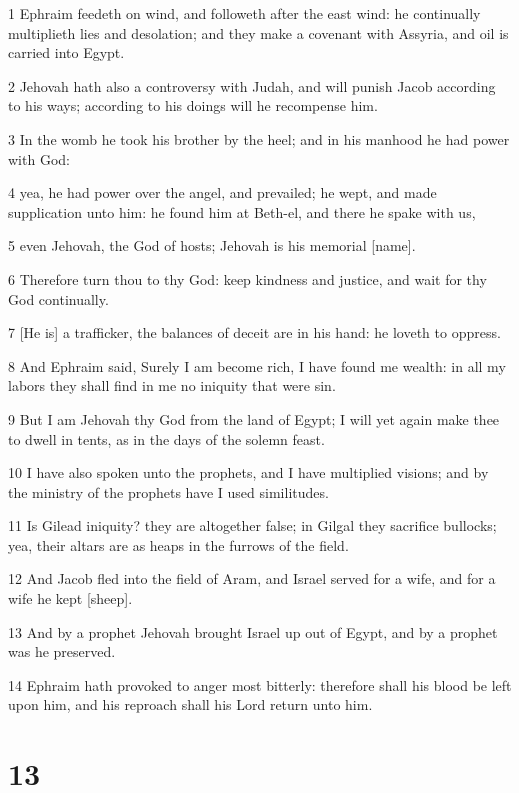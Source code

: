 \par 1 Ephraim feedeth on wind, and followeth after the east wind: he continually multiplieth lies and desolation; and they make a covenant with Assyria, and oil is carried into Egypt.
\par 2 Jehovah hath also a controversy with Judah, and will punish Jacob according to his ways; according to his doings will he recompense him.
\par 3 In the womb he took his brother by the heel; and in his manhood he had power with God:
\par 4 yea, he had power over the angel, and prevailed; he wept, and made supplication unto him: he found him at Beth-el, and there he spake with us,
\par 5 even Jehovah, the God of hosts; Jehovah is his memorial [name].
\par 6 Therefore turn thou to thy God: keep kindness and justice, and wait for thy God continually.
\par 7 [He is] a trafficker, the balances of deceit are in his hand: he loveth to oppress.
\par 8 And Ephraim said, Surely I am become rich, I have found me wealth: in all my labors they shall find in me no iniquity that were sin.
\par 9 But I am Jehovah thy God from the land of Egypt; I will yet again make thee to dwell in tents, as in the days of the solemn feast.
\par 10 I have also spoken unto the prophets, and I have multiplied visions; and by the ministry of the prophets have I used similitudes.
\par 11 Is Gilead iniquity? they are altogether false; in Gilgal they sacrifice bullocks; yea, their altars are as heaps in the furrows of the field.
\par 12 And Jacob fled into the field of Aram, and Israel served for a wife, and for a wife he kept [sheep].
\par 13 And by a prophet Jehovah brought Israel up out of Egypt, and by a prophet was he preserved.
\par 14 Ephraim hath provoked to anger most bitterly: therefore shall his blood be left upon him, and his reproach shall his Lord return unto him.

\chapter{13}

